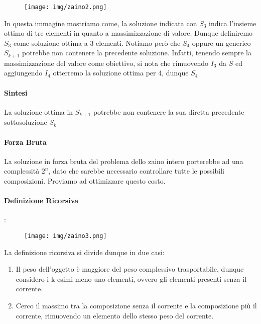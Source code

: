 \documentclass{article}
\begin{document}
\begin{figure}[htbp]
        \center
        \texttt{[image: img/zaino2.png]}
\end{figure}

In questa immagine mostriamo come, la soluzione indicata con $S_{3}$
indica l'insieme ottimo di tre elementi in quanto a massimizzazione di valore. Dunque definiremo $S_{3}$ come soluzione ottima a 3 elementi. Notiamo però che $S_{4}$ oppure un generico $S_{k+1}$ potrebbe non contenere la precedente soluzione. Infatti, tenendo sempre la massimizzazione del valore come obiettivo, si nota che rimuovendo $I_{3}$ da $S$ ed aggiungendo $I_{4}$ otterremo la soluzione ottima per 4, dunque $S_{4}$

\paragraph{Sintesi} La soluzione ottima in $S_{k+1}$ potrebbe non contenere la sua diretta precedente sottosoluzione $S_{k}$

\paragraph{Forza Bruta} La soluzione in forza bruta del problema dello zaino intero porterebbe ad una complessità $2^{n}$, dato che sarebbe necessario controllare tutte le possibili composizioni. Proviamo ad ottimizzare questo costo.

\newpage

\paragraph{Definizione Ricorsiva}:

\begin{figure}[htbp]
        \center
        \texttt{[image: img/zaino3.png]}
\end{figure}

La definizione ricorsiva si divide dunque in due casi:

\begin{enumerate}
    \item Il peso dell'oggetto è maggiore del peso complessivo trasportabile, dunque considero i k-esimi meno uno elementi, ovvero gli elementi presenti senza il corrente.
    \item Cerco il massimo tra la composizione senza il corrente e la composizione più il corrente, rimuovendo un elemento dello stesso peso del corrente.
\end{enumerate}
\end{document}
